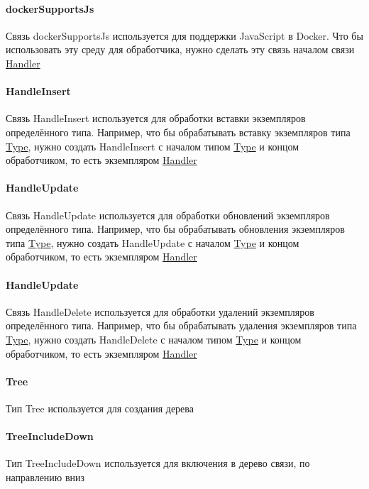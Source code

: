 \documentclass{article}
\begin{document}
\paragraph*{dockerSupportsJs}\hypertarget{Core.dockerSupportsJs.Description}{}
Связь dockerSupportsJs используется для
поддержки JavaScript в Docker. Что бы использовать эту среду для обработчика,
нужно сделать эту связь началом связи
\hyperlink{Core.Handler.Description}{Handler}
\paragraph*{HandleInsert}\hypertarget{Core.HandleInsert.Description}{}
Связь HandleInsert используется для обработки
вставки экземпляров определённого типа. Например, что бы обрабатывать вставку
экземпляров типа \hyperlink{Core.Type.Description}{Type}, нужно создать
HandleInsert с
началом типом \hyperlink{Core.Type.Description}{Type} и концом обработчиком, то
есть
экземпляром \hyperlink{Core.Handler.Description}{Handler}
\paragraph*{HandleUpdate}\hypertarget{Core.HandleUpdate.Description}{}
Связь HandleUpdate используется для обработки
обновлений экземпляров определённого типа. Например, что бы обрабатывать
обновления экземпляров типа \hyperlink{Core.Type.Description}{Type}, нужно
создать
HandleUpdate с началом \hyperlink{Core.Type.Description}{Type} и концом
обработчиком,
то есть экземпляром \hyperlink{Core.Handler.Description}{Handler}
\paragraph*{HandleUpdate}\hypertarget{Core.HandleDelete.Description}{}
Связь HandleDelete используется для обработки
удалений экземпляров определённого типа. Например, что бы обрабатывать удаления
экземпляров типа \hyperlink{Core.Type.Description}{Type}, нужно создать
HandleDelete с
началом типом \hyperlink{Core.Type.Description}{Type} и концом обработчиком, то
есть
экземпляром \hyperlink{Core.Handler.Description}{Handler}
\paragraph*{Tree}\hypertarget{Core.Tree.Description}{}
Тип Tree используется для создания дерева
\paragraph*{TreeIncludeDown}\hypertarget{Core.TreeIncludeDown.Description}{}
Тип TreeIncludeDown используется для
включения в дерево связи, по направлению вниз
\end{document}

